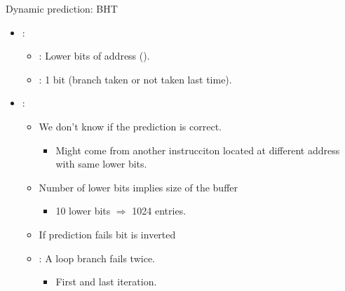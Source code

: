 \begin{frame}[t]{Dynamic prediction: BHT}
\begin{itemize}
  \item {}:
    \begin{itemize}
      \item {}: Lower bits of address ().
      \item {}: 1 bit (branch taken or not taken last time).
    \end{itemize}
  \item {}:
    \begin{itemize}
      \item We don't know if the prediction is correct.
        \begin{itemize}
          \item Might come from another instrucciton located at different
                address with same lower bits.
        \end{itemize}
        \item Number of lower bits implies size of the buffer
          \begin{itemize}
            \item 10 lower bits $\Rightarrow$ 1024 entries.
          \end{itemize}
        \item If prediction fails bit is inverted
        \item {}: A loop branch fails twice.
          \begin{itemize}
            \item First and last iteration.
          \end{itemize}
    \end{itemize}
\end{itemize}
\end{frame}

